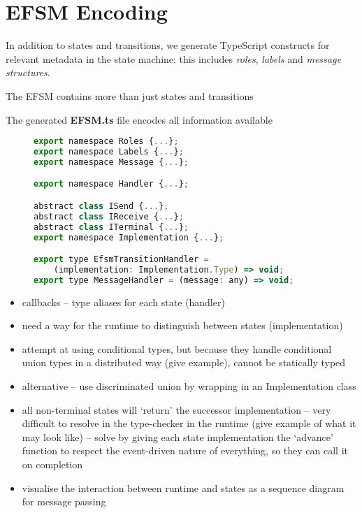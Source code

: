 \section{EFSM Encoding}
\label{section:nodeefsm}

In addition to states and transitions, we generate 
TypeScript constructs
for relevant metadata in the state machine: this includes
\textit{roles}, \textit{labels} and \textit{message structures}.


The EFSM contains more than just states and transitions

The generated \textbf{EFSM.ts} file encodes all information
available 

\begin{figure}
\begin{lstlisting}[language=javascript,tabsize=2]
export namespace Roles {...};
export namespace Labels {...};
export namespace Message {...};

export namespace Handler {...};

abstract class ISend {...};
abstract class IReceive {...};
abstract class ITerminal {...};
export namespace Implementation {...};

export type EfsmTransitionHandler =
	(implementation: Implementation.Type) => void;
export type MessageHandler = (message: any) => void;
\end{lstlisting}
\label{lst:nodeefsmfile}
\end{figure}

\begin{itemize}
\item callbacks -- type aliases for each state (handler)
\item need a way for the runtime to distinguish between states (implementation)
\item attempt at using conditional types, but because they handle conditional union types in a distributed way (give example), cannot be statically typed
\item alternative -- use discriminated union by wrapping in an Implementation class
\item all non-terminal states will `return' the successor implementation -- very difficult to resolve in the type-checker in the runtime (give example of what it may look like) -- solve by giving each state implementation the `advance' function to respect the event-driven nature of everything, so they can call it on completion
\item visualise the interaction between runtime and states as a sequence diagram for message passing
\end{itemize}

